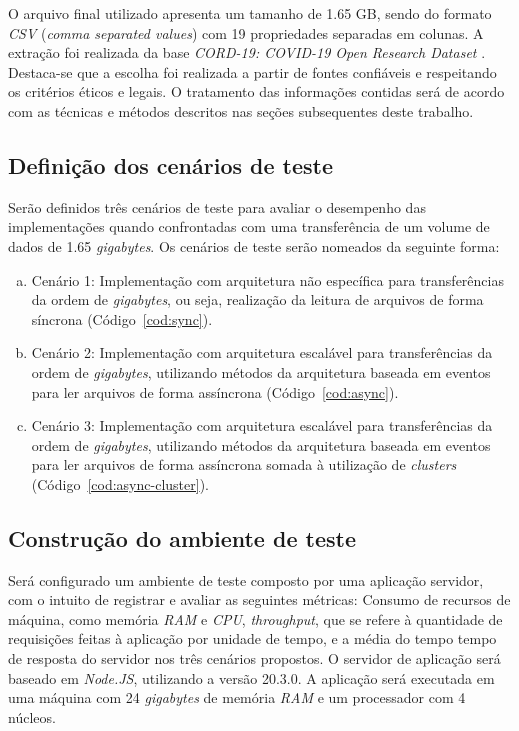 \documentclass[12pt]{article}
\begin{document}
O arquivo final utilizado apresenta um tamanho de 1.65 GB, sendo do formato \textit{CSV} (\textit{comma separated values}) 
com 19 propriedades separadas em colunas. A extração foi realizada da base 
\textit{CORD-19: COVID-19 Open Research Dataset} \cite{BASE}. Destaca-se que a escolha foi realizada a partir 
de fontes confiáveis e respeitando os critérios éticos e legais. O tratamento das informações contidas será de 
acordo com as técnicas e métodos descritos nas seções subsequentes deste trabalho.


\subsection{Definição dos cenários de teste}


Serão definidos três cenários de teste para avaliar o desempenho das implementações quando confrontadas
com uma transferência de um volume de dados de 1.65 \textit{gigabytes}. Os cenários de teste serão 
nomeados da seguinte forma:

\begin{enumerate}[a)]
\item Cenário 1: Implementação com arquitetura não específica para transferências da ordem de \textit{gigabytes}, 
ou seja, realização da leitura de arquivos de forma síncrona (Código~\ref{cod:sync}).
\item Cenário 2: Implementação com arquitetura escalável para transferências da ordem de \textit{gigabytes}, 
utilizando métodos da arquitetura baseada em eventos para ler arquivos de forma assíncrona (Código~\ref{cod:async}).
\item Cenário 3: Implementação com arquitetura escalável para transferências da ordem de \textit{gigabytes}, 
utilizando métodos da arquitetura baseada em eventos para ler arquivos de forma assíncrona somada à utilização de
\textit{clusters} (Código~\ref{cod:async-cluster}).
\end{enumerate}


\subsection{Construção do ambiente de teste}

Será configurado um ambiente de teste composto por uma aplicação servidor, com o intuito de registrar e avaliar as seguintes métricas:
Consumo de recursos de máquina, como memória \textit{RAM} e \textit{CPU}, \textit{throughput}, que se refere à quantidade de requisições feitas à aplicação por unidade de tempo,
e a média do tempo tempo de resposta do servidor nos três cenários propostos. 
O servidor de aplicação será baseado em \textit{Node.JS}, utilizando a versão 20.3.0. A aplicação será executada em uma máquina
com 24 \textit{gigabytes} de memória \textit{RAM} e um processador com 4 núcleos.
\end{document}
